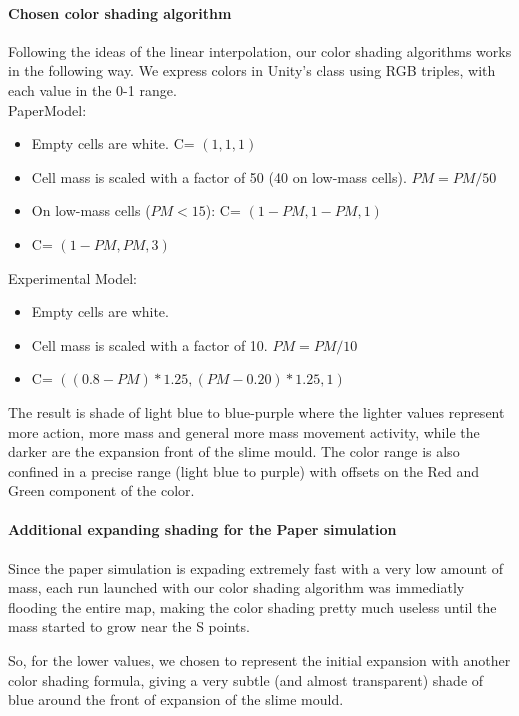 \paragraph{Chosen color shading algorithm}

Following the ideas of the linear interpolation, our color shading algorithms works in the following way. We express colors in Unity's class using RGB triples, with each value in the 0-1 range.\\

PaperModel:

\begin{itemize}
    \item Empty cells are white. C= $(1,1,1)$
    \item Cell mass is scaled with a factor of 50 (40 on low-mass cells). $PM = PM/50$
    \item On low-mass cells ($PM < 15$): C= $(1-PM,1-PM,1)$
    \item C= $(1-PM,PM,3)$
\end{itemize}

Experimental Model:

\begin{itemize}
    \item Empty cells are white.
    \item Cell mass is scaled with a factor of 10. $PM = PM/10$
    \item C= $((0.8-PM)*1.25,(PM-0.20)*1.25,1)$
\end{itemize}

The result is shade of light blue to blue-purple where the lighter values represent more action, more mass and general more mass movement activity, while the darker are the expansion front of the slime mould. The color range is also confined in a precise range (light blue to purple) with offsets on the Red and Green component of the color.

\paragraph{Additional expanding shading for the Paper simulation}

Since the paper simulation is expading extremely fast with a very low amount of mass, each run launched with our color shading algorithm was immediatly flooding the entire map, making the color shading pretty much useless until the mass started to grow near the S points.

So, for the lower values, we chosen to represent the initial expansion with another color shading formula, giving a very subtle (and almost transparent) shade of blue around the front of expansion of the slime mould.